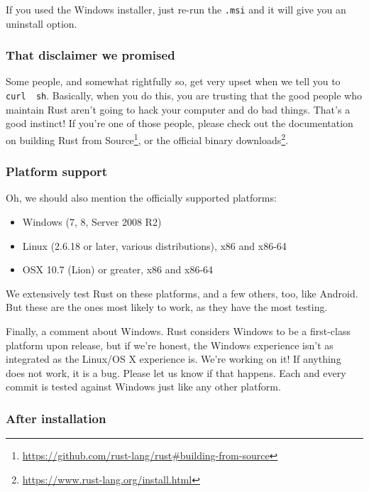 \documentclass[a4paper,]{book}
\renewcommand{\href}[2]{#2\footnote{\url{#1}}}
\providecommand{\tightlist}{%
  \setlength{\itemsep}{0pt}\setlength{\parskip}{0pt}}
\begin{document}
If you used the Windows installer, just re-run the \texttt{.msi} and it
will give you an uninstall option.

\subsubsection{That disclaimer we
promised}\label{that-disclaimer-we-promised}

Some people, and somewhat rightfully so, get very upset when we tell you
to \texttt{curl\ \textbar{}\ sh}. Basically, when you do this, you are
trusting that the good people who maintain Rust aren't going to hack
your computer and do bad things. That's a good instinct! If you're one
of those people, please check out the documentation on
\href{https://github.com/rust-lang/rust\#building-from-source}{building
Rust from Source}, or \href{https://www.rust-lang.org/install.html}{the
official binary downloads}.

\subsubsection{Platform support}\label{platform-support}

Oh, we should also mention the officially supported platforms:

\begin{itemize}
\tightlist
\item
  Windows (7, 8, Server 2008 R2)
\item
  Linux (2.6.18 or later, various distributions), x86 and x86-64
\item
  OSX 10.7 (Lion) or greater, x86 and x86-64
\end{itemize}

We extensively test Rust on these platforms, and a few others, too, like
Android. But these are the ones most likely to work, as they have the
most testing.

Finally, a comment about Windows. Rust considers Windows to be a
first-class platform upon release, but if we're honest, the Windows
experience isn't as integrated as the Linux/OS X experience is. We're
working on it! If anything does not work, it is a bug. Please let us
know if that happens. Each and every commit is tested against Windows
just like any other platform.

\subsubsection{After installation}\label{after-installation}
\end{document}
